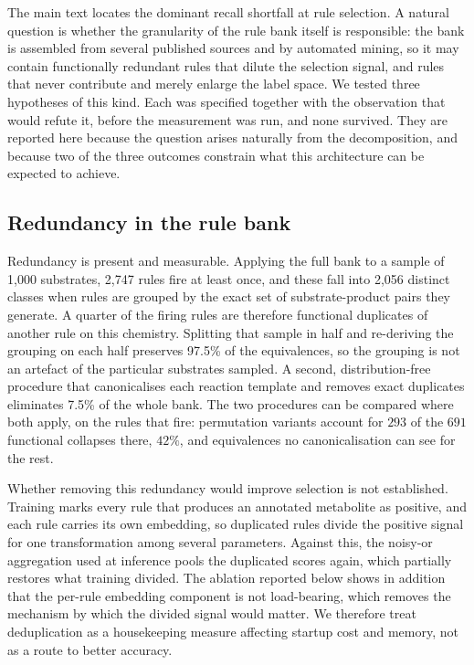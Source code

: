 The main text locates the dominant recall shortfall at rule selection. A natural question is
whether the granularity of the rule bank itself is responsible: the bank is assembled from several
published sources and by automated mining, so it may contain functionally redundant rules that
dilute the selection signal, and rules that never contribute and merely enlarge the label space.
We tested three hypotheses of this kind. Each was specified together with the observation that
would refute it, before the measurement was run, and none survived. They are reported here because
the question arises naturally from the decomposition, and because two of the three outcomes
constrain what this architecture can be expected to achieve.

\subsection{Redundancy in the rule bank}

Redundancy is present and measurable. Applying the full bank to a sample of 1{,}000 substrates,
2{,}747 rules fire at least once, and these fall into 2{,}056 distinct classes when rules are
grouped by the exact set of substrate-product pairs they generate. A quarter of the firing rules
are therefore functional duplicates of another rule on this chemistry. Splitting that sample in
half and re-deriving the grouping on each half preserves 97.5\% of the equivalences, so the
grouping is not an artefact of the particular substrates sampled. A second, distribution-free
procedure that canonicalises each reaction template and removes exact duplicates eliminates 7.5\% of
the whole bank. The two procedures can be compared where both apply, on the rules that fire:
permutation variants account for $293$ of the $691$ functional collapses there, $42\%$,
and equivalences no canonicalisation can see for the rest.

Whether removing this redundancy would improve selection is not established. Training marks every
rule that produces an annotated metabolite as positive, and each rule carries its own embedding,
so duplicated rules divide the positive signal for one transformation among several parameters.
Against this, the noisy-or aggregation used at inference pools the duplicated scores again, which
partially restores what training divided. The ablation reported below shows in addition that the
per-rule embedding component is not load-bearing, which removes the mechanism by which the divided
signal would matter. We therefore treat deduplication as a housekeeping measure affecting startup
cost and memory, not as a route to better accuracy.

